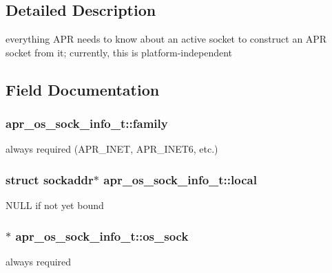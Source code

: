 \subsection{Detailed Description}
everything A\+PR needs to know about an active socket to construct an A\+PR socket from it; currently, this is platform-\/independent 

\subsection{Field Documentation}
\subsubsection[{\texorpdfstring{family}{family}}]{ apr\+\_\+os\+\_\+sock\+\_\+info\+\_\+t\+::family}\hypertarget{structapr__os__sock__info__t_aa29fd0cf57b0b5e3559961f068fa8b7e}{}\label{structapr__os__sock__info__t_aa29fd0cf57b0b5e3559961f068fa8b7e}
always required (A\+P\+R\+\_\+\+I\+N\+ET, A\+P\+R\+\_\+\+I\+N\+E\+T6, etc.) 
\subsubsection[{\texorpdfstring{local}{local}}]{\setlength{\rightskip}{0pt plus 5cm}struct {\bf sockaddr}$\ast$ apr\+\_\+os\+\_\+sock\+\_\+info\+\_\+t\+::local}\hypertarget{structapr__os__sock__info__t_afaf470560cbc3088479af708878aa086}{}\label{structapr__os__sock__info__t_afaf470560cbc3088479af708878aa086}
N\+U\+LL if not yet bound 
\subsubsection[{\texorpdfstring{os\+\_\+sock}{os_sock}}]{$\ast$ apr\+\_\+os\+\_\+sock\+\_\+info\+\_\+t\+::os\+\_\+sock}\hypertarget{structapr__os__sock__info__t_a952464d2f91ca4650e8b4848a81745b5}{}\label{structapr__os__sock__info__t_a952464d2f91ca4650e8b4848a81745b5}
always required 
